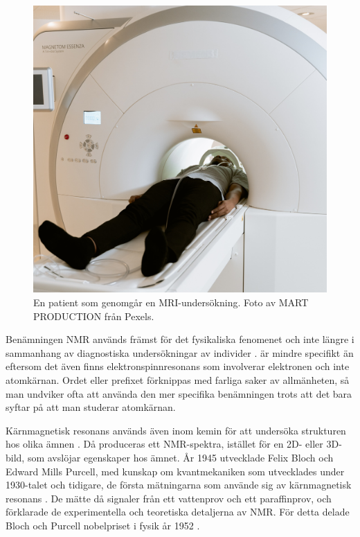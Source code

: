 \documentclass[11pt, a4paper]{article}
\begin{document}
\begin{figure}[ht]
	\centering
	\includegraphics[width=.7\textwidth]{mri_patient}
	\caption{En patient som genomgår en MRI-undersökning. Foto av MART PRODUCTION \parencite*{fig:mri_patient} från Pexels.}
	\label{fig:mri_patient}
\end{figure}

Benämningen NMR används främst för det fysikaliska fenomenet och inte längre i sammanhang av diagnostiska undersökningar av individer \parencite{nmr_eller_mri}.  är mindre specifikt än  eftersom det även finns elektronspinnresonans som involverar elektronen och inte atomkärnan. Ordet  eller prefixet  förknippas med farliga saker av allmänheten, så man undviker ofta att använda den mer specifika benämningen trots att det bara syftar på att man studerar atomkärnan.

Kärnmagnetisk resonans används även inom kemin för att undersöka strukturen hos olika ämnen \parencite{nmr_kemi}. Då produceras ett NMR-spektra, istället för en 2D- eller 3D-bild, som avslöjar egenskaper hos ämnet. År 1945 utvecklade Felix Bloch och Edward Mills Purcell, med kunskap om kvantmekaniken som utvecklades under 1930-talet och tidigare, de första mätningarna som använde sig av kärnmagnetisk resonans \parencite{mri_lärobok}. De mätte då signaler från ett vattenprov och ett paraffinprov, och förklarade de experimentella och teoretiska detaljerna av NMR. För detta delade Bloch och Purcell nobelpriset i fysik år 1952 \parencite{nmr_nobelpris}.
\end{document}
